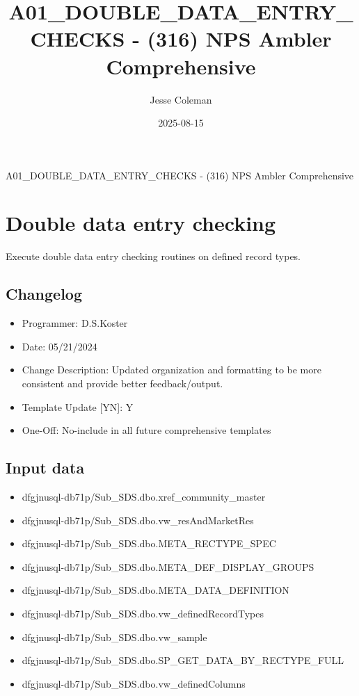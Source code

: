 \documentclass[
]{article}
\title{A01\_DOUBLE\_DATA\_ENTRY\_CHECKS - (316) NPS Ambler
Comprehensive}
\author{Jesse Coleman}
\date{2025-08-15}
\providecommand{\tightlist}{%
  \setlength{\itemsep}{0pt}\setlength{\parskip}{0pt}}
\begin{document}
\maketitle

A01\_DOUBLE\_DATA\_ENTRY\_CHECKS - (316) NPS Ambler Comprehensive

\section{Double data entry checking}\label{double-data-entry-checking}

Execute double data entry checking routines on defined record types.

\subsection{Changelog}\label{changelog}

\begin{itemize}
\tightlist
\item
  Programmer: D.S.Koster\\
\item
  Date: 05/21/2024\\
\item
  Change Description: Updated organization and formatting to be more
  consistent and provide better feedback/output.\\
\item
  Template Update {[}Y\textbar N{]}: Y\\
\item
  One-Off: No-include in all future comprehensive templates
\end{itemize}

\subsection{Input data}\label{input-data}

\begin{itemize}
\tightlist
\item
  dfgjnusql-db71p/Sub\_SDS.dbo.xref\_community\_master\\
\item
  dfgjnusql-db71p/Sub\_SDS.dbo.vw\_resAndMarketRes\\
\item
  dfgjnusql-db71p/Sub\_SDS.dbo.META\_RECTYPE\_SPEC\\
\item
  dfgjnusql-db71p/Sub\_SDS.dbo.META\_DEF\_DISPLAY\_GROUPS\\
\item
  dfgjnusql-db71p/Sub\_SDS.dbo.META\_DATA\_DEFINITION
\item
  dfgjnusql-db71p/Sub\_SDS.dbo.vw\_definedRecordTypes\\
\item
  dfgjnusql-db71p/Sub\_SDS.dbo.vw\_sample\\
\item
  dfgjnusql-db71p/Sub\_SDS.dbo.SP\_GET\_DATA\_BY\_RECTYPE\_FULL\\
\item
  dfgjnusql-db71p/Sub\_SDS.dbo.vw\_definedColumns
\end{itemize}
\end{document}
